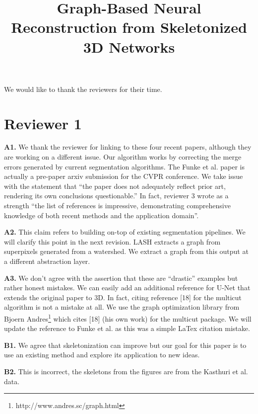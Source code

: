 \documentclass[10pt,twocolumn,letterpaper]{article}
\begin{document}
\title{Graph-Based Neural Reconstruction from Skeletonized 3D Networks}  %

\maketitle
\thispagestyle{empty}



We would like to thank the reviewers for their time.

\section*{Reviewer 1}

\textbf{A1.} We thank the reviewer for linking to these four recent papers, although they are working on a different issue. Our algorithm works by correcting the merge errors generated by current segmentation algorithms.  The Funke et al. paper is actually a pre-paper arxiv submission for the CVPR conference. We take issue with the statement that ``the paper does not adequately reflect prior art, rendering its own conclusions questionable.'' In fact, reviewer 3 wrote as a strength ``the list of references is impressive, demonstrating comprehensive knowledge of both recent methods and the application domain''.

\textbf{A2.} This claim refers to building on-top of existing segmentation pipelines. We will clarify this point in the next revision. LASH extracts a graph from superpixels generated from a watershed. We extract a graph from this output at a different abstraction layer.

\textbf{A3.} We don't agree with the assertion that these are ``drastic'' examples but rather honest mistakes. We can easily add an additional reference for U-Net that extends the original paper to 3D. In fact, citing reference [18] for the multicut algorithm is not a mistake at all. We use the graph optimization library from Bjoern Andres\footnote{http://www.andres.sc/graph.html} which cites [18] (his own work) for the multicut package. 
We will update the reference to Funke et al. as this was a simple LaTex citation mistake.

\textbf{B1.} We agree that skeletonization can improve but our goal for this paper is to use an existing method and explore its application to new ideas.

\textbf{B2.} This is incorrect, the skeletons from the figures are from the Kasthuri et al. data.
\end{document}
